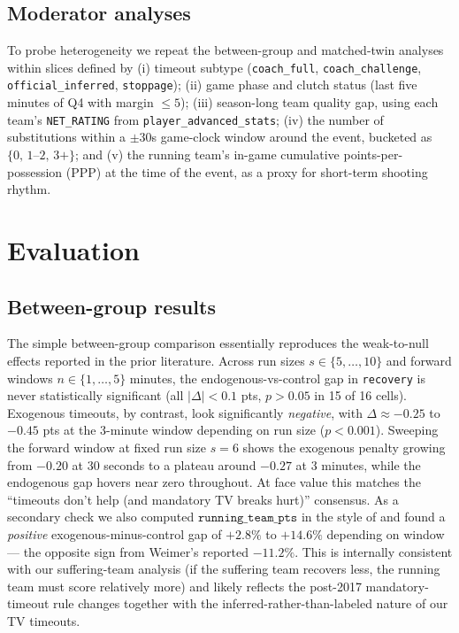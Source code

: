 \documentclass[twoside,11pt]{article}
\begin{document}
\subsection{Moderator analyses}

To probe heterogeneity we repeat the between-group and matched-twin analyses within slices defined by
(i) timeout subtype (\texttt{coach\_full}, \texttt{coach\_challenge}, \texttt{official\_inferred},
\texttt{stoppage}); (ii) game phase and clutch status (last five minutes of Q4 with margin $\leq 5$);
(iii) season-long team quality gap, using each team's \texttt{NET\_RATING} from \texttt{player\_advanced\_stats};
(iv) the number of substitutions within a $\pm 30$s game-clock window around the event, bucketed as
$\{0,\, 1\text{--}2,\, 3{+}\}$; and (v) the running team's in-game cumulative points-per-possession (PPP) at
the time of the event, as a proxy for short-term shooting rhythm.

\section{Evaluation}

\subsection{Between-group results}

The simple between-group comparison essentially reproduces the weak-to-null effects reported in the prior
literature. Across run sizes $s \in \{5,\dots,10\}$ and forward windows $n \in \{1,\dots,5\}$ minutes, the
endogenous-vs-control gap in \texttt{recovery} is never statistically significant (all $|\Delta| < 0.1$ pts,
$p > 0.05$ in 15 of 16 cells). Exogenous timeouts, by contrast, look significantly \emph{negative}, with
$\Delta \approx -0.25$ to $-0.45$ pts at the 3-minute window depending on run size ($p < 0.001$). Sweeping
the forward window at fixed run size $s = 6$ shows the exogenous penalty growing from $-0.20$ at 30 seconds
to a plateau around $-0.27$ at 3 minutes, while the endogenous gap hovers near zero throughout. At face value
this matches the ``timeouts don't help (and mandatory TV breaks hurt)'' consensus. As a secondary check we
also computed $\texttt{running\_team\_pts}$ in the style of \citet{weimer2023causal} and found a
\emph{positive} exogenous-minus-control gap of $+2.8\%$ to $+14.6\%$ depending on window --- the opposite sign
from Weimer's reported $-11.2\%$. This is internally consistent with our suffering-team analysis (if the
suffering team recovers less, the running team must score relatively more) and likely reflects the post-2017
mandatory-timeout rule changes together with the inferred-rather-than-labeled nature of our TV timeouts.
\end{document}
